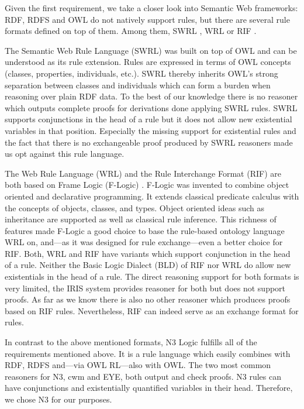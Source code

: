 

Given the first requirement, we take a closer look into Semantic Web frameworks:
RDF, RDFS and OWL do not natively support rules, but there are several rule formats defined on top of them. 
Among them, SWRL \cite{swrl}, WRL \cite{wrl} or RIF \cite{rif}. 


The Semantic Web Rule Language (SWRL) was built on top of OWL and can be understood as its rule extension. %
Rules are expressed in terms of OWL concepts
(classes, properties, individuals, etc.). SWRL thereby inherits OWL's strong separation between classes and individuals which can form a burden when
reasoning over plain RDF data.
To the best of our knowledge there is no reasoner which outputs complete proofs for derivations done applying SWRL rules. 
SWRL supports conjunctions in the head of a rule but it does not allow new existential variables in that position.
Especially the missing support for existential rules and the fact that there is no exchangeable proof produced by SWRL reasoners
made us opt against this rule language.


%

The Web Rule Language (WRL) and the Rule Interchange Format (RIF) are both based on Frame Logic (F-Logic) \cite{flogic}.
F-Logic was invented to combine object oriented and declarative programming. It extends classical predicate calculus with the concepts of objects,
classes, and types. Object oriented ideas such as inheritance are supported as well as classical rule inference. 
This richness of features made F-Logic a good choice to base the rule-based ontology language WRL on, and---as it was designed for rule exchange---even 
a better choice for RIF. Both, WRL and RIF have variants which support conjunction in the head of a rule. Neither the Basic Logic Dialect (BLD) of RIF nor
WRL do allow new existentials in the head of a rule. The direct reasoning support for both formats is very limited, 
the IRIS system \cite{iris} provides reasoner for both but does not support proofs. %
As far as we know there is also no other reasoner which produces proofs based on RIF rules.
Nevertheless, RIF can indeed serve as an exchange format for rules.



In contrast to the above mentioned formats, N3 Logic fulfills all of the requirements mentioned above. It is a rule language which easily combines with RDF, RDFS 
and---via OWL RL---also with OWL. The two most common reasoners for N3, cwm and EYE, 
both output and check proofs. N3 rules can have conjunctions and existentially quantified variables in their head. 
Therefore, we chose N3 for our purposes.

